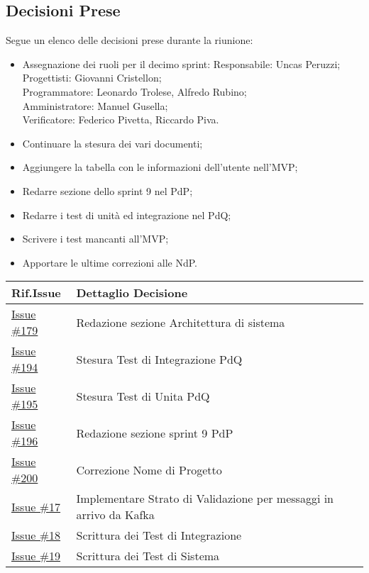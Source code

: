 \documentclass[10pt]{article}
\begin{document}
\subsection{Decisioni Prese}
Segue un elenco delle decisioni prese durante la riunione:
\begin{itemize}
    \item   Assegnazione dei ruoli per il decimo sprint:
            Responsabile: Uncas Peruzzi;\\
            Progettisti: Giovanni Cristellon;\\
            Programmatore: Leonardo Trolese, Alfredo Rubino;\\
            Amministratore: Manuel Gusella;\\
            Verificatore: Federico Pivetta, Riccardo Piva.
    \item Continuare la stesura dei vari documenti;
    \item Aggiungere la tabella con le informazioni dell'utente nell'MVP;
    \item Redarre sezione dello sprint 9 nel PdP;
    \item Redarre i test di unità ed integrazione nel PdQ;
    \item Scrivere i test mancanti all'MVP;
    \item Apportare le ultime correzioni alle NdP.
\end{itemize}

\begin{center}
    \begin{tabular}{|>{\centering\arraybackslash}m{3cm}|>{\centering\arraybackslash}m{12cm}|}
	\hline
	\textbf{Rif.Issue} & \textbf{Dettaglio Decisione}\\
	\hline  
            \href{https://github.com/SevenBitsSwe/7BitsDocs/issues/179}{Issue \#179} & Redazione sezione Architettura di sistema\\
        \hline
            \href{https://github.com/SevenBitsSwe/7BitsDocs/issues/194}{Issue \#194} & Stesura Test di Integrazione PdQ\\
        \hline
            \href{https://github.com/SevenBitsSwe/7BitsDocs/issues/195}{Issue \#195} & Stesura Test di Unita PdQ\\
        \hline
            \href{https://github.com/SevenBitsSwe/7BitsDocs/issues/196}{Issue \#196} & Redazione sezione sprint 9 PdP\\
        \hline
            \href{https://github.com/SevenBitsSwe/7BitsDocs/issues/200}{Issue \#200} & Correzione Nome di Progetto\\
        \hline
            \href{https://github.com/SevenBitsSwe/MVP/issues/17}{Issue \#17} & Implementare Strato di Validazione per messaggi in arrivo da Kafka\\
        \hline
            \href{https://github.com/SevenBitsSwe/MVP/issues/18}{Issue \#18} & Scrittura dei Test di Integrazione\\
        \hline
            \href{https://github.com/SevenBitsSwe/MVP/issues/19}{Issue \#19} & Scrittura dei Test di Sistema\\
        \hline
    \end{tabular}
\end{center}
\end{document}
